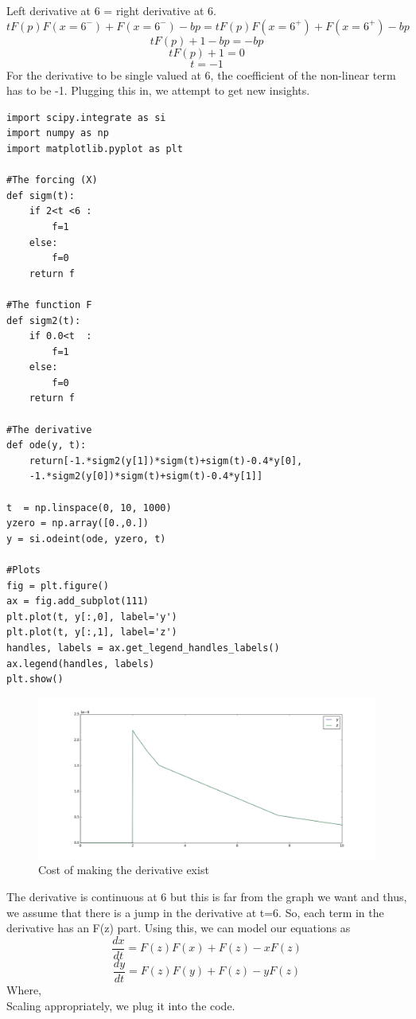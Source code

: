 \documentclass[a4paper]{article}
\begin{document}
Left derivative at 6 = right derivative at 6.
\[tF(p)F(x=6^-)+F(x=6^-)-bp=tF(p)F(x=6^+)+F(x=6^+)-bp\]
\[tF(p)+1-bp=-bp\]  
\[tF(p)+1=0\]  
\[t=-1\]
For the derivative to be single valued at 6, the coefficient of the non-linear term has to be -1. Plugging this in, we attempt to get new insights.
 	\begin{lstlisting}[style=MyPythonstyle]
import scipy.integrate as si
import numpy as np
import matplotlib.pyplot as plt

#The forcing (X)
def sigm(t):
	if 2<t <6 :
		f=1
	else:
		f=0  
	return f

#The function F	
def sigm2(t):
	if 0.0<t  :
		f=1
	else:
		f=0  
	return f 

#The derivative    
def ode(y, t):
	return[-1.*sigm2(y[1])*sigm(t)+sigm(t)-0.4*y[0],
	-1.*sigm2(y[0])*sigm(t)+sigm(t)-0.4*y[1]]

t  = np.linspace(0, 10, 1000) 
yzero = np.array([0.,0.])
y = si.odeint(ode, yzero, t)

#Plots
fig = plt.figure()
ax = fig.add_subplot(111)
plt.plot(t, y[:,0], label='y')
plt.plot(t, y[:,1], label='z')
handles, labels = ax.get_legend_handles_labels()
ax.legend(handles, labels)
plt.show() 
 	\end{lstlisting}
 	   \begin{figure}[H]
 	   	\centering
 	   	\includegraphics[width=12cm]{disc}
 	   	\caption{Cost of making the derivative exist}
 	   \end{figure}	 	
The derivative is continuous at 6 but this is far from the graph we want and thus, we assume that there is a jump in the derivative at t=6. So, each term in the derivative has an F(z) part. Using this, we can model our equations as
\[\frac{dx}{dt} = F(z)F(x)+F(z)-xF(z)\] 	
\[\frac{dy}{dt} = F(z)F(y)+F(z)-yF(z)\] 
Where,
\[\]
Scaling appropriately, we plug it into the code.
\end{document}
